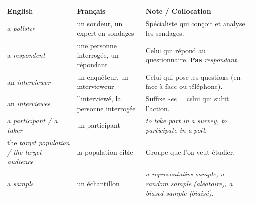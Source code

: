 \documentclass[11pt]{article}
\newcommand{\eng}[1]{\ifmmode\text{\textit{#1}}\else\begingroup\selectlanguage{english}\itshape #1\endgroup\fi}
\begin{document}
\begin{propriete}
\begin{center}
\begin{tabularx}{\linewidth}{|X|X|X|}
\hline
\rowcolor{popblueL} \textbf{English} & \textbf{Français} & \textbf{Note / Collocation} \\
\hline
a \eng{pollster} & un sondeur, un expert en sondages & Spécialiste qui conçoit et analyse les sondages. \\
\hline
a \eng{respondent} & une personne interrogée, un répondant & Celui qui répond au questionnaire. \textbf{Pas} \eng{respondant}. \\
\hline
an \eng{interviewer} & un enquêteur, un intervieweur & Celui qui pose les questions (en face-à-face ou téléphone). \\
\hline
an \eng{interviewee} & l'interviewé, la personne interrogée & Suffixe \emph{-ee} = celui qui subit l'action. \\
\hline
a \eng{participant} / a \eng{taker} & un participant & \eng{to take part in a survey}, \eng{to participate in a poll}. \\
\hline
the \eng{target population} / the \eng{target audience} & la population cible & Groupe que l'on veut étudier. \\
\hline
a \eng{sample} & un échantillon & \eng{a representative sample}, \eng{a random sample} (aléatoire), \eng{a biased sample} (biaisé). \\
\hline
\end{tabularx}
\end{center}
\end{propriete}
\end{document}

